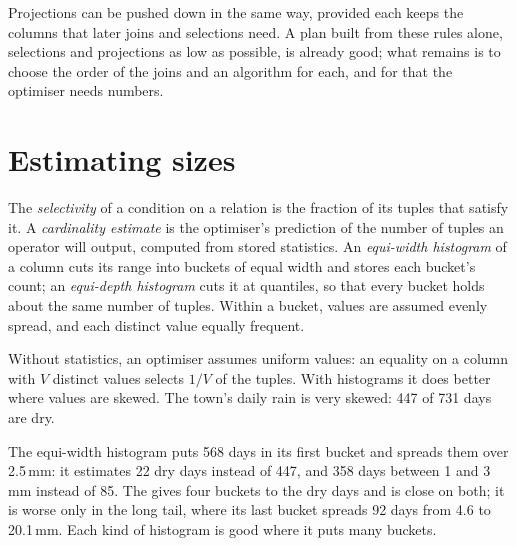 Projections can be pushed down in the same way, provided each keeps the columns that later joins and selections need. A plan built from these rules alone, selections and projections as low as possible, is already good; what remains is to choose the order of the joins and an algorithm for each, and for that the optimiser needs numbers.

\section{Estimating sizes}\label{sec:b3:query-optimisation:estimates}

\begin{definition}\label{def:b3:query-optimisation:estimates}
The \emph{selectivity} of a condition on a relation is the fraction of its tuples that satisfy it. A \emph{cardinality estimate} is the optimiser's prediction of the number of tuples an operator will output, computed from stored statistics. An \emph{equi-width histogram} of a column cuts its range into buckets of equal width and stores each bucket's count; an \emph{equi-depth histogram} cuts it at quantiles, so that every bucket holds about the same number of tuples. Within a bucket, values are assumed evenly spread, and each distinct value equally frequent.
\end{definition}

Without statistics, an optimiser assumes uniform values: an equality on a column with $V$ distinct values selects $1/V$ of the tuples. With histograms it does better where values are skewed. The town's daily rain is very skewed: 447 of 731 days are dry.

\label{lst:b3:query-optimisation:histogram}

\label{out:b3:query-optimisation:histogram}

The equi-width histogram puts 568 days in its first bucket and spreads them over 2.5\,mm: it estimates 22 dry days instead of 447, and 358 days between 1 and 3\,mm instead of 85. The  gives four buckets to the dry days and is close on both; it is worse only in the long tail, where its last bucket spreads 92 days from 4.6 to 20.1\,mm. Each kind of histogram is good where it puts many buckets.

